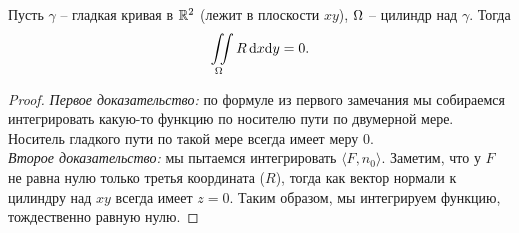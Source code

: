 \begin{remark}
    Пусть $\gamma$ -- гладкая кривая в $\mathbb{R}^2$ (лежит в плоскости $xy$), $\Omega$ -- цилиндр над $\gamma$. Тогда
\[
    \iint\limits_{\Omega}{R \,\mathrm{d} x \mathrm{d} y} = 0
.\] 
\end{remark}
\begin{proof}
    \enewline
    \textit{Первое доказательство:} по формуле из первого замечания мы собираемся интегрировать
    какую-то функцию по носителю пути по двумерной мере. Носитель гладкого пути по такой мере
    всегда имеет меру 0. \\
    \textit{Второе доказательство:} мы пытаемся интегрировать $\langle F, n_0 \rangle$.
    Заметим, что у $F$ не равна нулю только третья координата ($R$), тогда как
    вектор нормали к цилиндру над $xy$ всегда имеет $z = 0$. Таким
    образом, мы интегрируем функцию, тождественно равную нулю.
\end{proof}

